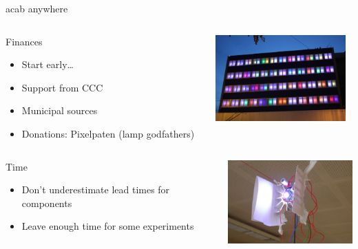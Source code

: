 \documentclass{beamer}
\begin{document}
\begin{frame}{acab anywhere}
  \begin{columns}
    \begin{column}{5cm}
      \begin{block}{Finances}
        \begin{itemize}
        \item Start early\ldots
        \item Support from CCC
	\item Municipal sources
        \item Donations: Pixelpaten (lamp godfathers)
        \end{itemize}
      \end{block}
    \end{column}
    \begin{column}{5cm}
      \includegraphics[width=5cm]{bilder/pixelpaten.JPG}
    \end{column}
  \end{columns}
  \begin{columns}
    \begin{column}{5cm}
      \begin{block}{Time}
        \begin{itemize}
        \item Don't underestimate lead times for components 
        \item Leave enough time for some experiments
        \end{itemize}
      \end{block}
    \end{column}
    \begin{column}{5cm}
      \includegraphics[width=5cm]{bilder/rumprobieren.JPG}
    \end{column}
  \end{columns}
\end{frame}
\end{document}
